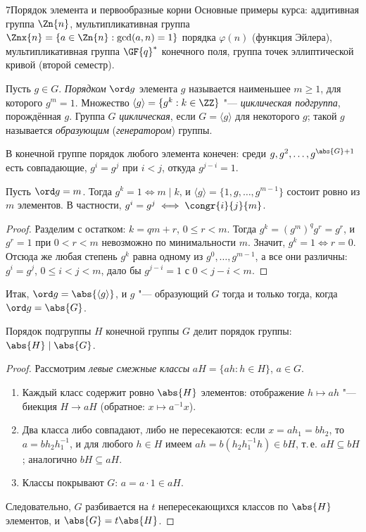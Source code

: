\begin{lecture}{7}{Порядок элемента и первообразные корни}
Основные примеры курса: аддитивная группа $\Zn{n}$, мультипликативная группа
$\Znx{n} = \{a \in \Zn{n} : \gcd(a, n) = 1\}$ порядка $\varphi(n)$ (функция Эйлера),
мультипликативная группа $\GF{q}^*$ конечного поля, группа точек эллиптической кривой
(второй семестр).

\begin{definition}
Пусть $g \in G$. \emph{Порядком} $\ord g$ элемента $g$ называется наименьшее $m \ge 1$, для
которого $g^m = 1$. Множество $\langle g \rangle = \{g^k : k \in \ZZ\}$ "--- \emph{циклическая
подгруппа}, порождённая $g$. Группа $G$ \emph{циклическая}, если $G = \langle g \rangle$ для
некоторого $g$; такой $g$ называется \emph{образующим} (\emph{генератором}) группы.
\end{definition}

В конечной группе порядок любого элемента конечен: среди $g, g^2, \dots, g^{\abs{G}+1}$ есть
совпадающие, $g^i = g^j$ при $i < j$, откуда $g^{j-i} = 1$.

\begin{proposition}\label{l7:divides}
Пусть $\ord g = m$. Тогда $g^k = 1 \iff m \mid k$, и
$\langle g \rangle = \{1, g, \dots, g^{m-1}\}$ состоит ровно из $m$ элементов. В частности,
$g^i = g^j \iff \congr{i}{j}{m}$.
\end{proposition}

\begin{proof}
Разделим с остатком: $k = qm + r$, $0 \le r < m$. Тогда $g^k = (g^m)^q g^r = g^r$, и
$g^r = 1$ при $0 < r < m$ невозможно по минимальности $m$. Значит, $g^k = 1 \iff r = 0$.
Отсюда же любая степень $g^k$ равна одному из $g^0, \dots, g^{m-1}$, а все они различны:
$g^i = g^j$, $0 \le i < j < m$, дало бы $g^{j-i} = 1$ с $0 < j - i < m$.
\end{proof}

Итак, $\ord g = \abs{\langle g \rangle}$, и $g$ "--- образующий $G$ тогда и только тогда, когда
$\ord g = \abs{G}$.

\begin{theorem}[Лагранж]\label{l7:lagrange}
Порядок подгруппы $H$ конечной группы $G$ делит порядок группы: $\abs{H} \mid \abs{G}$.
\end{theorem}

\begin{proof}
Рассмотрим \emph{левые смежные классы} $aH = \{ah : h \in H\}$, $a \in G$.
\begin{enumerate}
  \item Каждый класс содержит ровно $\abs{H}$ элементов: отображение $h \mapsto ah$ "---
    биекция $H \to aH$ (обратное: $x \mapsto a^{-1} x$).
  \item Два класса либо совпадают, либо не пересекаются: если $x = ah_1 = bh_2$, то
    $a = b h_2 h_1^{-1}$, и для любого $h \in H$ имеем $ah = b(h_2 h_1^{-1} h) \in bH$, т.\,е.
    $aH \subseteq bH$; аналогично $bH \subseteq aH$.
  \item Классы покрывают $G$: $a = a \cdot 1 \in aH$.
\end{enumerate}
Следовательно, $G$ разбивается на $t$ непересекающихся классов по $\abs{H}$ элементов, и
$\abs{G} = t\abs{H}$.
\end{proof}


\end{lecture}
